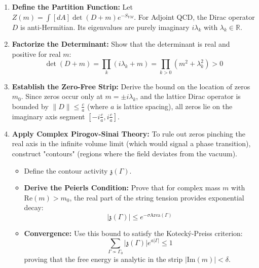 \begin{enumerate}
    \item \textbf{Define the Partition Function:}
    Let $Z(m) = \int [dA] \det(D + m) e^{-S_{YM}}$.
    For Adjoint QCD, the Dirac operator $D$ is anti-Hermitian. Its eigenvalues are purely imaginary $i\lambda_k$ with $\lambda_k \in \mathbb{R}$.

    \item \textbf{Factorize the Determinant:}
    Show that the determinant is real and positive for real $m$:
    \begin{equation}
        \det(D+m) = \prod_k (i\lambda_k + m) = \prod_{k>0} (m^2 + \lambda_k^2) > 0
    \end{equation}

    \item \textbf{Establish the Zero-Free Strip:}
    Derive the bound on the location of zeros $m_0$. Since zeros occur only at $m = \pm i \lambda_k$, and the lattice Dirac operator is bounded by $\|D\| \le \frac{c}{a}$ (where $a$ is lattice spacing), all zeros lie on the imaginary axis segment $[-i\frac{c}{a}, i\frac{c}{a}]$.

    \item \textbf{Apply Complex Pirogov-Sinai Theory:}
    To rule out zeros pinching the real axis in the infinite volume limit (which would signal a phase transition), construct "contours" (regions where the field deviates from the vacuum).
    \begin{itemize}
        \item Define the contour activity $\mathfrak{z}(\Gamma)$.
        \item \textbf{Derive the Peierls Condition:} Prove that for complex mass $m$ with $\text{Re}(m) > m_0$, the real part of the string tension provides exponential decay:
        \begin{equation}
            |\mathfrak{z}(\Gamma)| \le e^{-\sigma \text{Area}(\Gamma)}
        \end{equation}
        \item \textbf{Convergence:} Use this bound to satisfy the Kotecký-Preiss criterion:
        \begin{equation}
            \sum_{\Gamma \nsim \Gamma_0} |\mathfrak{z}(\Gamma)| e^{a |\Gamma|} \le 1
        \end{equation}
        proving that the free energy is analytic in the strip $|\text{Im}(m)| < \delta$.
    \end{itemize}
\end{enumerate}


